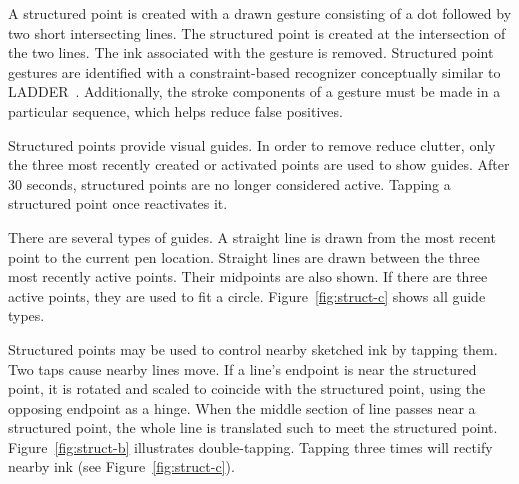 \documentclass{egpubl}
\begin{document}
A structured point is created with a drawn gesture consisting of a dot
followed by two short intersecting lines. The structured point is
created at the intersection of the two lines. The ink associated with
the gesture is removed. Structured point gestures are identified with
a constraint-based recognizer conceptually similar to
LADDER~\cite{hammond-ladder}. Additionally, the stroke components of a
gesture must be made in a particular sequence, which helps reduce
false positives.

Structured points provide visual guides. In order to remove reduce
clutter, only the three most recently created or activated points are
used to show guides. After 30 seconds, structured points are no longer
considered active. Tapping a structured point once reactivates it.

There are several types of guides. A straight line is drawn from the
most recent point to the current pen location. Straight lines are
drawn between the three most recently active points. Their midpoints
are also shown. If there are three active points, they are used to fit
a circle. Figure~\ref{fig:struct-c} shows all guide types.

Structured points may be used to control nearby sketched ink by
tapping them. Two taps cause nearby lines move. If a line's endpoint
is near the structured point, it is rotated and scaled to coincide with
the structured point, using the opposing endpoint as a hinge. When the
middle section of line passes near a structured point, the whole line
is translated such to meet the structured
point. Figure~\ref{fig:struct-b} illustrates double-tapping. Tapping
three times will rectify nearby ink (see Figure~\ref{fig:struct-c}).

\end{document}
